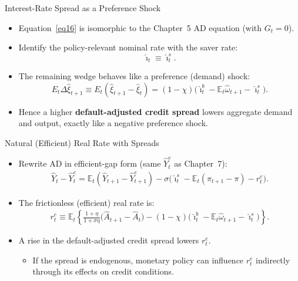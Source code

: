 \documentclass[11pt,aspectratio=169]{beamer}
\newcommand{\E}{\mathbb{E}}
\begin{document}
\begin{frame}{Interest-Rate Spread as a Preference Shock}
\small
\begin{itemize}
  \item Equation~\eqref{eq16} is isomorphic to the Chapter~5 AD equation (with $G_t=0$).
  \vspace{0.25em}
  \item Identify the policy-relevant nominal rate with the saver rate:
  \[
    \hat{\imath}_t\equiv \hat{\imath}_t^s.
  \]
  \item The remaining wedge behaves like a preference (demand) shock:
  \[
    E_t\Delta\hat{\xi}_{t+1}
    \equiv
    E_t(\hat{\xi}_{t+1}-\hat{\xi}_t)
    =(1-\chi)\Big(\hat{\imath}_t^b-\E_t\hat{\omega}_{t+1}-\hat{\imath}_t^s\Big).
  \]
  \vspace{0.25em}
  \item Hence a higher \textbf{default-adjusted credit spread} lowers aggregate demand and output, exactly like a negative preference shock.
\end{itemize}
\end{frame}

\begin{frame}{Natural (Efficient) Real Rate with Spreads}
\small
\begin{itemize}
  \item Rewrite AD in efficient-gap form (same $\hat Y_t^e$ as Chapter~7):
  \begin{align}
    \hat{Y}_t-\hat{Y}_t^{e}
    =\E_t(\hat{Y}_{t+1}-\hat{Y}_{t+1}^{e})
    -\sigma\Big(\hat{\imath}_t^s-\E_t(\pi_{t+1}-\pi)-r_t^{e}\Big).
    \label{eq17}
  \end{align}
  \vspace{0.25em}
  \item The frictionless (efficient) real rate is:
  \begin{align}
    r_t^{e}
    \equiv
    \E_t\!\left\{
      \frac{1+\eta}{1+\sigma\eta}\big(\hat{A}_{t+1}-\hat{A}_t\big)
      -(1-\chi)\big(\hat{\imath}_t^b-\E_t\hat{\omega}_{t+1}-\hat{\imath}_t^s\big)
    \right\}.
    \label{eq18}
  \end{align}
  \vspace{0.25em}
  \item A rise in the default-adjusted credit spread lowers $r_t^e$.
  \begin{itemize}
    \item If the spread is endogenous, monetary policy can influence $r_t^e$ indirectly through its effects on credit conditions.
  \end{itemize}
\end{itemize}
\end{frame}
\end{document}
